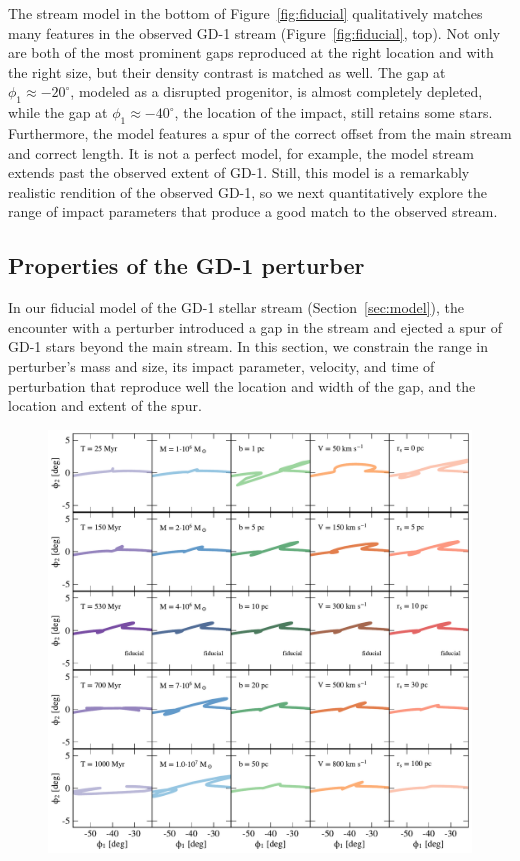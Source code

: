 \documentclass[12pt, modern]{aastex62}
\begin{document}
The stream model in the bottom of Figure~\ref{fig:fiducial} qualitatively matches many features in the observed GD-1 stream (Figure~\ref{fig:fiducial}, top).
Not only are both of the most prominent gaps reproduced at the right location and with the right size, but their density contrast is matched as well.
The gap at $\phi_1\approx-20^\circ$, modeled as a disrupted progenitor, is almost completely depleted, while the gap at $\phi_1\approx-40^\circ$, the location of the impact, still retains some stars.
Furthermore, the model features a spur of the correct offset from the main stream and correct length.
It is not a perfect model, for example, the model stream extends past the observed extent of GD-1.
Still, this model is a remarkably realistic rendition of the observed GD-1, so we next quantitatively explore the range of impact parameters that produce a good match to the observed stream.

\subsection{Properties of the GD-1 perturber}
\label{sec:perturber_properties}
In our fiducial model of the GD-1 stellar stream (Section~\ref{sec:model}), the encounter with a perturber introduced a gap in the stream and ejected a spur of GD-1 stars beyond the main stream.
In this section, we constrain the range in perturber's mass and size, its impact parameter, velocity, and time of perturbation that reproduce well the location and width of the gap, and the location and extent of the spur.

\begin{figure}
\begin{center}
\includegraphics[width=\textwidth]{excursions.pdf}
\end{center}
\caption{}
\label{fig:scalings}
\end{figure}
\end{document}
